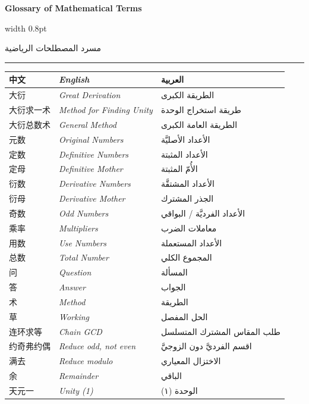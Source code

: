 \documentclass[11pt,a4paper]{article}
\newlength{\cnwidth}
\newlength{\arwidth}
\newcommand{\parallelsection}[2]{%
  \par\bigskip\noindent
  \begin{minipage}[t]{\cnwidth}%
    \Large\bfseries\color{sectioncolor} #1%
  \end{minipage}%
  \hfill\textcolor{colrule}{\vrule width 0.8pt}\hfill
  \begin{minipage}[t]{\arwidth}%
    \Large\arabicfontbf\color{sectioncolor}\beginR #2\endR%
  \end{minipage}%
  \par\medskip\noindent\textcolor{colrule}{\rule{\textwidth}{0.6pt}}\par\medskip
}
\begin{document}
\newpage

\parallelsection{Glossary of Mathematical Terms}{مسرد المصطلحات الرياضية}

\begin{center}
\renewcommand{\arraystretch}{1.3}
\newcommand{\arentry}[1]{{\arabicfont\beginR #1\endR}}
\begin{tabular}{>{\chfont}l >{\itshape}l l}
\toprule
\textbf{中文} & \textbf{English} & \textbf{العربية} \\
\midrule
大衍 & Great Derivation & \arentry{الطريقة الكبرى} \\
大衍求一术 & Method for Finding Unity & \arentry{طريقة استخراج الوحدة} \\
大衍总数术 & General Method & \arentry{الطريقة العامة الكبرى} \\
元数 & Original Numbers & \arentry{الأعداد الأصليَّة} \\
定数 & Definitive Numbers & \arentry{الأعداد المثبتة} \\
定母 & Definitive Mother & \arentry{الأُمّ المثبتة} \\
衍数 & Derivative Numbers & \arentry{الأعداد المشتقَّة} \\
衍母 & Derivative Mother & \arentry{الجذر المشترك} \\
奇数 & Odd Numbers & \arentry{الأعداد الفرديَّة / البواقي} \\
乘率 & Multipliers & \arentry{معاملات الضرب} \\
用数 & Use Numbers & \arentry{الأعداد المستعملة} \\
总数 & Total Number & \arentry{المجموع الكلي} \\
问 & Question & \arentry{المسألة} \\
答 & Answer & \arentry{الجواب} \\
术 & Method & \arentry{الطريقة} \\
草 & Working & \arentry{الحل المفصل} \\
连环求等 & Chain GCD & \arentry{طلب المقاس المشترك المتسلسل} \\
约奇弗约偶 & Reduce odd, not even & \arentry{اقسم الفرديَّ دون الزوجيَّ} \\
满去 & Reduce modulo & \arentry{الاختزال المعياري} \\
余 & Remainder & \arentry{الباقي} \\
天元一 & Unity (1) & \arentry{الوحدة (١)} \\
\bottomrule
\end{tabular}
\end{center}
\end{document}
